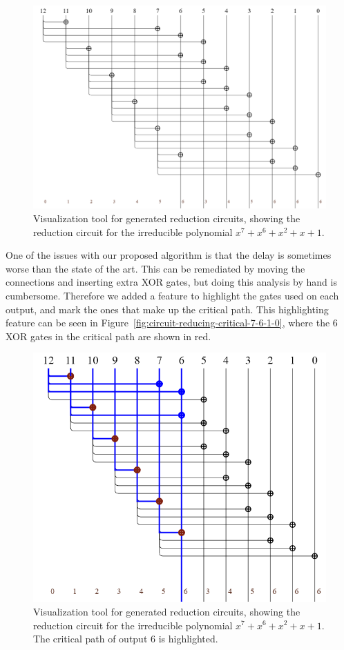 \begin{figure}
  \caption{Visualization tool for generated reduction circuits, showing the reduction circuit for the irreducible polynomial $x^7 + x^6 + x^2 + x + 1$.}
  \label{fig:circuit-reducing-7-6-2-1-0}
  \centering
  \includegraphics[width = 1\columnwidth]{figures/reducing-7-6-2-1-0.png}
\end{figure}

One of the issues with our proposed algorithm is that the delay is sometimes worse than the state of the art. This can be remediated by moving the connections and inserting extra XOR gates, but doing this analysis by hand is cumbersome. Therefore we added a feature to highlight the gates used on each output, and mark the ones that make up the critical path. This highlighting feature can be seen in Figure~\ref{fig:circuit-reducing-critical-7-6-1-0}, where the 6 XOR gates in the critical path are shown in red.

\begin{figure}
  \caption{Visualization tool for generated reduction circuits, showing the reduction circuit for the irreducible polynomial $x^7 + x^6 + x^2 + x + 1$. The critical path of output 6 is highlighted.}
  \label{fig:circuit-reducing-critical-7-6-2-1-0}
  \centering
  \includegraphics[width = .8\columnwidth]{figures/reducing-critical-7-6-2-1-0.png}
\end{figure}

